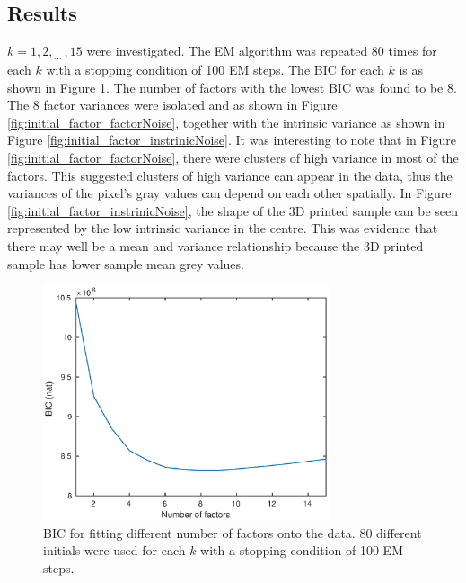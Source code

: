 \documentclass[12pt]{report}
\newcommand{\dotdotdot}{_{\phantom{.}\cdots}}
\begin{document}
\subsection{Results}
$k=1,2,\dotdotdot,15$ were investigated. The EM algorithm was repeated 80 times for each $k$ with a stopping condition of 100 EM steps. The BIC for each $k$ is as shown in Figure \ref{fig:initial_factor_BIC}. The number of factors with the lowest BIC was found to be 8. The 8 factor variances were isolated and as shown in Figure \ref{fig:initial_factor_factorNoise}, together with the intrinsic variance as shown in Figure \ref{fig:initial_factor_instrinicNoise}. It was interesting to note that in Figure \ref{fig:initial_factor_factorNoise}, there were clusters of high variance in most of the factors. This suggested clusters of high variance can appear in the data, thus the variances of the pixel's gray values can depend on each other spatially. In Figure \ref{fig:initial_factor_instrinicNoise}, the shape of the 3D printed sample can be seen represented by the low intrinsic variance in the centre. This was evidence that there may well be a mean and variance relationship because the 3D printed sample has lower sample mean grey values.

\begin{figure}
	\centering
	\includegraphics[width=0.75\textwidth]{figures/initial_factor_BIC.eps}
	\caption{BIC for fitting different number of factors onto the data. 80 different initials were used for each $k$ with a stopping condition of 100 EM steps.}
	\label{fig:initial_factor_BIC}
\end{figure}
\end{document}
